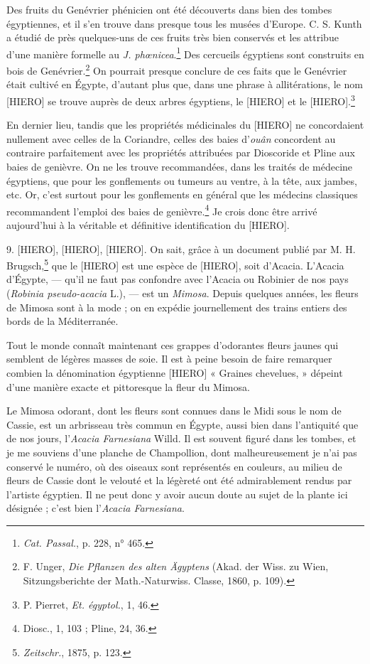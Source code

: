 \documentclass[a4paper, 11pt, oneside]{article}
\begin{document}
Des fruits du Genévrier phénicien ont été découverts dans bien des tombes égyptiennes, et il s'en trouve dans presque tous les musées d'Europe. C. S. Kunth a étudié de près quelques-uns de ces fruits très bien conservés et les attribue d'une manière formelle au \emph{J. phœnicea}.\footnote{\emph{Cat. Passal.}, p. 228, n° 465.} Des cercueils égyptiens sont construits en bois de Genévrier.\footnote{F. Unger, \emph{Die Pflanzen des alten Ägyptens} (Akad. der Wiss. zu Wien, Sitzungsberichte der Math.-Naturwiss. Classe, 1860, p. 109).} On pourrait presque conclure de ces faits que le Genévrier était cultivé en Égypte, d'autant plus que, dans une phrase à allitérations, le nom [HIERO] se trouve auprès de deux arbres égyptiens, le [HIERO] et le [HIERO].\footnote{P. Pierret, \emph{Et. égyptol.}, 1, 46.}

En dernier lieu, tandis que les propriétés médicinales du [HIERO] ne concordaient nullement avec celles de la Coriandre, celles des baies d'\emph{ouân} concordent au contraire parfaitement avec les propriétés attribuées par Dioscoride et Pline aux baies de genièvre. On ne les trouve recommandées, dans les traités de médecine égyptiens, que pour les gonflements ou tumeurs au ventre, à la tête, aux jambes, etc. Or, c'est surtout pour les gonflements en général que les médecins classiques recommandent l'emploi des baies de genièvre.\footnote{Diosc., 1, 103 ; Pline, 24, 36.} Je crois donc être arrivé aujourd'hui à la véritable et définitive identification du [HIERO].

9. [HIERO], [HIERO], [HIERO]. On sait, grâce à un document publié par M. H. Brugsch,\footnote{\emph{Zeitschr.}, 1875, p. 123.} que le [HIERO] est une espèce de [HIERO], soit d'Acacia. L'Acacia d'Égypte, --- qu'il ne faut pas confondre avec l'Acacia ou Robinier de nos pays (\emph{Robinia pseudo-acacia} L.), --- est un \emph{Mimosa}. Depuis quelques années, les fleurs de Mimosa sont à la mode ; on en expédie journellement des trains entiers des bords de la Méditerranée.

Tout le monde connaît maintenant ces grappes d'odorantes fleurs jaunes qui semblent de légères masses de soie. Il est à peine besoin de faire remarquer combien la dénomination égyptienne [HIERO] « Graines chevelues, » dépeint d'une manière exacte et pittoresque la fleur du Mimosa.

Le Mimosa odorant, dont les fleurs sont connues dans le Midi sous le nom de Cassie, est un arbrisseau très commun en Égypte, aussi bien dans l'antiquité que de nos jours, l'\emph{Acacia Farnesiana} Willd. Il est souvent figuré dans les tombes, et je me souviens d'une planche de Champollion, dont malheureusement je n'ai pas conservé le numéro, où des oiseaux sont représentés en couleurs, au milieu de fleurs de Cassie dont le velouté et la légèreté ont été admirablement rendus par l'artiste égyptien. Il ne peut donc y avoir aucun doute au sujet de la plante ici désignée ; c'est bien l'\emph{Acacia Farnesiana}.
\end{document}

